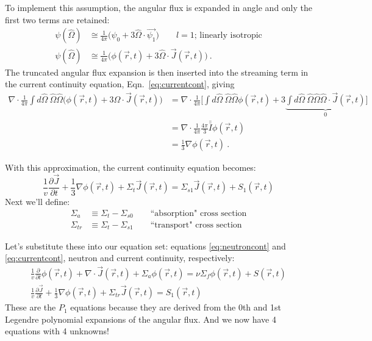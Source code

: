 \documentclass[12pt]{article}
\newcommand{\vOmega}{\ensuremath{\hat{\Omega}}}
\begin{document}
To implement this assumption, the angular flux is expanded in angle and only the first two terms are retained:  
%
\begin{align*}
\psi(\vOmega) &\cong  \frac{1}{4\pi}\bigl( \psi_{0} + 3\vOmega \cdot \vec{\psi_{1}} \bigr) \qquad l=1 \text{; linearly isotropic} \\
%
\psi(\vOmega) &\cong \frac{1}{4\pi}\bigl(\phi(\vec{r}, t) + 3 \vOmega \cdot \vec{J}(\vec{r}, t)\bigr) \:.
\end{align*}
The truncated angular flux expansion is then inserted into the streaming term in the current continuity equation, Eqn.\ \eqref{eq:currentcont}, giving 
%
\begin{align*}
  \nabla \cdot \frac{1}{4\pi} \int d \vOmega \:\vOmega \vOmega  \bigl(\phi(\vec{r}, t) + 3 \vOmega \cdot \vec{J}(\vec{r}, t)\bigr) &=  
%
\nabla \cdot \frac{1}{4\pi} \bigl[\int d \vOmega \:\vOmega \vOmega  \phi(\vec{r}, t) 
%
+ 3 \underbrace{\int d \vOmega \:\vOmega \vOmega \vOmega \cdot \vec{J}(\vec{r}, t)}_{0} \bigr] \nonumber \\
% 
&= \nabla \cdot \frac{1}{4\pi} \frac{4\pi}{3}\bar{\bar{I}} \phi(\vec{r}, t) \\
%
  &= \frac{1}{3} \nabla \phi(\vec{r}, t) \:.
\end{align*}

With this approximation, the current continuity equation becomes:
\begin{equation}
\frac{1}{v}\frac{\partial \vec{J}}{\partial t} 
+ \frac{1}{3} \nabla \phi(\vec{r}, t) +
\Sigma_t  \vec{J}(\vec{r}, t) =
\Sigma_{s1} \vec{J}(\vec{r},t)
+ S_{1}(\vec{r}, t) \nonumber
\end{equation}
%
Next we'll define:
\begin{align*}
\Sigma_a &\equiv \Sigma_t - \Sigma_{s0} \qquad \text{``absorption" cross section}\\
\Sigma_{tr} &\equiv \Sigma_t - \Sigma_{s1} \qquad \text{``transport" cross section}
\end{align*}

Let's substitute these into our equation set: equations \eqref{eq:neutroncont} and \eqref{eq:currentcont}, neutron and current continuity, respectively:
%
\begin{align*}
\frac{1}{v}\frac{\partial}{\partial t}\phi(\vec{r}, t) + 
\nabla \cdot \vec{J}(\vec{r}, t) + 
\Sigma_a \phi(\vec{r}, t) =
\nu \Sigma_f \phi(\vec{r}, t) +
S(\vec{r}, t) \\
%
\frac{1}{v}\frac{\partial \vec{J}}{\partial t} 
+ \frac{1}{3} \nabla \phi(\vec{r}, t) +
\Sigma_{tr}  \vec{J}(\vec{r}, t) =
S_{1}(\vec{r}, t) 
\end{align*}
%
These are the $P_1$ equations because they are derived from the 0th and 1st Legendre polynomial expansions of the angular flux. And we now have 4 equations with 4 unknowns!
\end{document}
